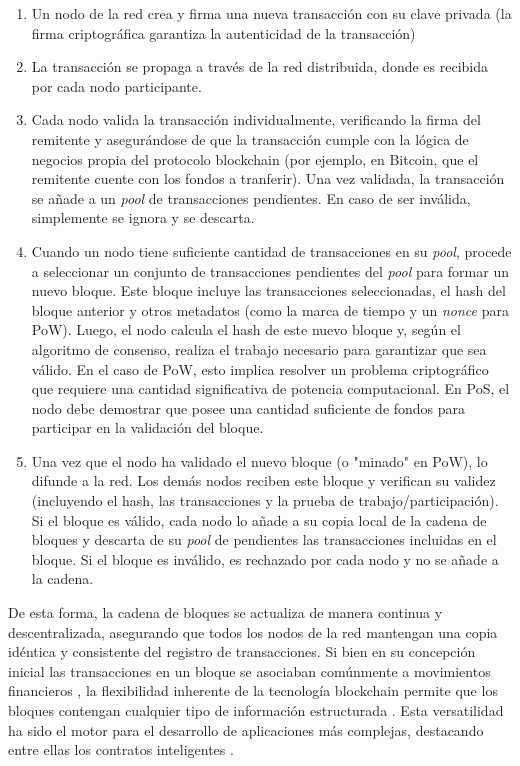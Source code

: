 \begin{enumerate}
    \item Un nodo de la red crea y firma una nueva transacción con su clave privada (la firma criptográfica garantiza la autenticidad de la transacción)
    \item La transacción se propaga a través de la red distribuida, donde es recibida por cada nodo participante.
    \item Cada nodo valida la transacción individualmente, verificando la firma del remitente y asegurándose de que la transacción cumple con la lógica de negocios propia del protocolo blockchain (por ejemplo, en Bitcoin, que el remitente cuente con los fondos a tranferir). Una vez validada, la transacción se añade a un \textit{pool} de transacciones pendientes. En caso de ser inválida, simplemente se ignora y se descarta. 
    \item Cuando un nodo tiene suficiente cantidad de transacciones en su \textit{pool}, procede a seleccionar un conjunto de transacciones pendientes del \textit{pool} para formar un nuevo bloque. Este bloque incluye las transacciones seleccionadas, el hash del bloque anterior y otros metadatos (como la marca de tiempo y un \textit{nonce} para PoW). Luego, el nodo calcula el hash de este nuevo bloque y, según el algoritmo de consenso, realiza el trabajo necesario para garantizar que sea válido. En el caso de PoW, esto implica resolver un problema criptográfico que requiere una cantidad significativa de potencia computacional. En PoS, el nodo debe demostrar que posee una cantidad suficiente de fondos para participar en la validación del bloque.
    \item Una vez que el nodo ha validado el nuevo bloque (o "minado" en PoW), lo difunde a la red. Los demás nodos reciben este bloque y verifican su validez (incluyendo el hash, las transacciones y la prueba de trabajo/participación). Si el bloque es válido, cada nodo lo añade a su copia local de la cadena de bloques y descarta de su \textit{pool} de pendientes las transacciones incluidas en el bloque. Si el bloque es inválido, es rechazado por cada nodo y no se añade a la cadena.
\end{enumerate}

De esta forma, la cadena de bloques se actualiza de manera continua y descentralizada, asegurando que todos los nodos de la red mantengan una copia idéntica y consistente del registro de transacciones. Si bien en su concepción inicial las transacciones en un bloque se asociaban comúnmente a movimientos financieros \cite{satoshi2008bitcoin}, la flexibilidad inherente de la tecnología blockchain permite que los bloques contengan cualquier tipo de información estructurada \cite{bartolomeo2020introduccion}. Esta versatilidad ha sido el motor para el desarrollo de aplicaciones más complejas, destacando entre ellas los contratos inteligentes \cite{sunny2022systematic}.


